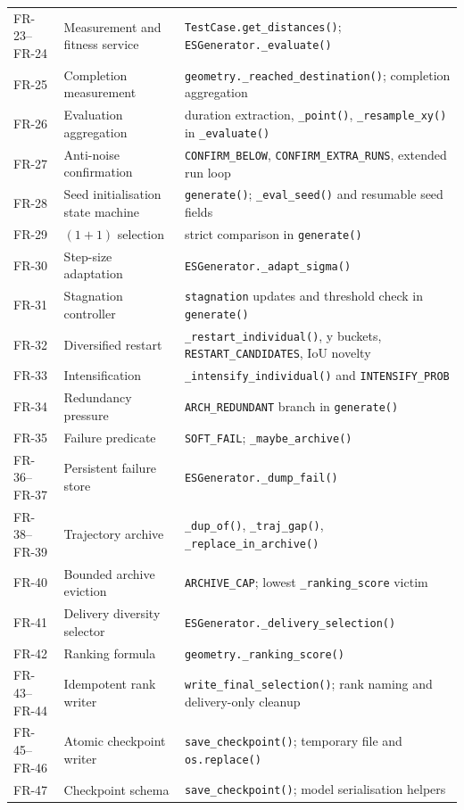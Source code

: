 \documentclass[11pt,a4paper,openany]{report}
\newcommand{\code}[1]{\texttt{#1}}
\begin{document}
\begin{longtable}{L{2.3cm} L{4.2cm} L{7.7cm}}
FR-23--FR-24 & Measurement and fitness service & \code{TestCase.get\_distances()}; \code{ESGenerator.\_evaluate()}\\
FR-25 & Completion measurement & \code{geometry.\_reached\_destination()}; completion aggregation\\
FR-26 & Evaluation aggregation & duration extraction, \code{\_point()}, \code{\_resample\_xy()} in \code{\_evaluate()}\\
FR-27 & Anti-noise confirmation & \code{CONFIRM\_BELOW}, \code{CONFIRM\_EXTRA\_RUNS}, extended run loop\\
FR-28 & Seed initialisation state machine & \code{generate()}; \code{\_eval\_seed()} and resumable seed fields\\
FR-29 & $(1+1)$ selection & strict comparison in \code{generate()}\\
FR-30 & Step-size adaptation & \code{ESGenerator.\_adapt\_sigma()}\\
FR-31 & Stagnation controller & \code{stagnation} updates and threshold check in \code{generate()}\\
FR-32 & Diversified restart & \code{\_restart\_individual()}, y buckets, \code{RESTART\_CANDIDATES}, IoU novelty\\
FR-33 & Intensification & \code{\_intensify\_individual()} and \code{INTENSIFY\_PROB}\\
FR-34 & Redundancy pressure & \code{ARCH\_REDUNDANT} branch in \code{generate()}\\
FR-35 & Failure predicate & \code{SOFT\_FAIL}; \code{\_maybe\_archive()}\\
FR-36--FR-37 & Persistent failure store & \code{ESGenerator.\_dump\_fail()}\\
FR-38--FR-39 & Trajectory archive & \code{\_dup\_of()}, \code{\_traj\_gap()}, \code{\_replace\_in\_archive()}\\
FR-40 & Bounded archive eviction & \code{ARCHIVE\_CAP}; lowest \code{\_ranking\_score} victim\\
FR-41 & Delivery diversity selector & \code{ESGenerator.\_delivery\_selection()}\\
FR-42 & Ranking formula & \code{geometry.\_ranking\_score()}\\
FR-43--FR-44 & Idempotent rank writer & \code{write\_final\_selection()}; rank naming and delivery-only cleanup\\
FR-45--FR-46 & Atomic checkpoint writer & \code{save\_checkpoint()}; temporary file and \code{os.replace()}\\
FR-47 & Checkpoint schema & \code{save\_checkpoint()}; model serialisation helpers\\

\end{longtable}
\end{document}

